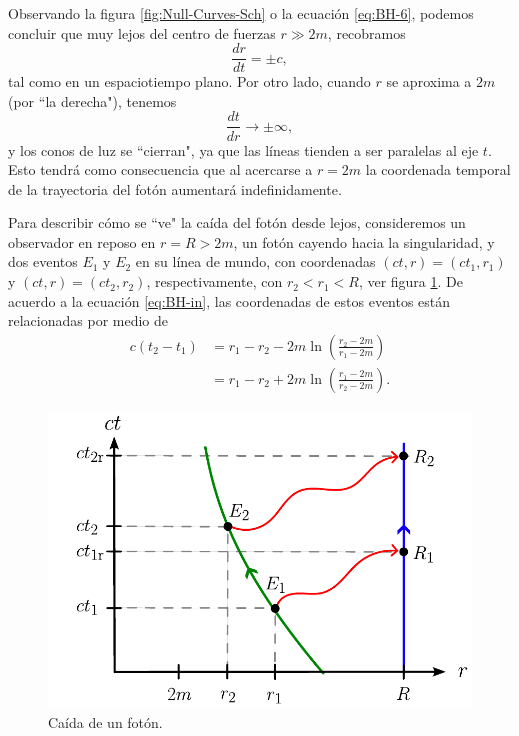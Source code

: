 \documentclass[letterpaper,11pt]{article}
\begin{document}
Observando la figura \ref{fig:Null-Curves-Sch} o la ecuación \eqref{eq:BH-6}, podemos concluir que muy lejos del centro de fuerzas $r \gg 2m$, recobramos
\begin{equation}
\frac{dr}{dt} = \pm c,
\end{equation}
tal como en un espaciotiempo plano. Por otro lado, cuando $r$ se aproxima a $2m$ (por ``la derecha"), tenemos
\begin{equation}
\frac{dt}{dr} \to \pm \infty,
\end{equation}
y los conos de luz se ``cierran", ya que las líneas tienden a ser paralelas al eje $t$. Esto tendrá como consecuencia que al acercarse a $r = 2m$ la coordenada temporal de la trayectoria del fotón aumentará indefinidamente.

Para describir cómo se ``ve" la caída del fotón desde lejos, consideremos un observador en reposo en $r = R > 2m$, un fotón cayendo hacia la singularidad, y dos eventos $E_1$ y $E_2$ en su línea de mundo, con coordenadas $(ct,r) = (ct_1,r_1)$ y $(ct,r) = (ct_2,r_2)$, respectivamente, con $r_2 < r_1 < R$, ver figura \ref{fig:Photon-Falss}. De acuerdo a la ecuación \eqref{eq:BH-in}, las coordenadas de estos eventos están relacionadas por medio de
\begin{align}
c(t_2 - t_1) &= r_1 - r_2 - 2m \ln\left(\frac{r_2 - 2m}{r_1 - 2m}\right) \nonumber\\
&= r_1 - r_2 + 2m \ln\left(\frac{r_1 - 2m}{r_2 - 2m}\right). \label{eq:BH-7}
\end{align}

\begin{figure}
\centering
\includegraphics[scale=0.7]{Fig-Caida-Foton}
\caption{Caída de un fotón.}
\label{fig:Photon-Falss}
\end{figure}
\end{document}
